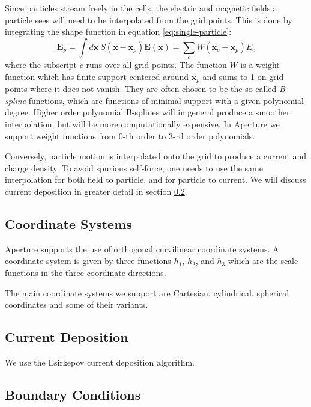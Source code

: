 Since particles stream freely in the cells, the electric and magnetic
fields a particle sees will need to be interpolated from the grid
points. This is done by integrating the shape function in equation
\eqref{eq:single-particle}:
\begin{equation}
    \label{eq:field-interpolate}
    \mathbf{E}_p = \int d\mathbf{x}\: S(\mathbf{x} - \mathbf{x}_p)\mathbf{E}(\mathbf{x}) = \sum_c W(\mathbf{x}_c - \mathbf{x}_p)E_c
\end{equation}
where the subscript $c$ runs over all grid points. The function $W$ is
a weight function which has finite support centered around
$\mathbf{x}_p$ and sums to 1 on grid points where it does not
vanish. They are often chosen to be the so called \textit{B-spline}
functions, which are functions of minimal support with a given
polynomial degree. Higher order polynomial B-splines will in general
produce a smoother interpolation, but will be more computationally
expensive. In Aperture we support weight functions from 0-th order to
3-rd order polynomials.

Conversely, particle motion is interpolated onto the grid to produce a
current and charge density. To avoid spurious self-force, one needs to
use the same interpolation for both field to particle, and for
particle to current. We will discuss current deposition in greater
detail in section \ref{sec:charge-cons-curr}.

\subsection{Coordinate Systems}
\label{sec:coord-syst-sing}

Aperture supports the use of orthogonal curvilinear coordinate
systems. A coordinate system is given by three functions $h_1$, $h_2$,
and $h_3$ which are the scale functions in the three coordinate
directions.

The main coordinate systems we support are Cartesian, cylindrical,
spherical coordinates and some of their variants.

\subsection{Current Deposition}
\label{sec:charge-cons-curr}

We use the Esirkepov current deposition algorithm.

\subsection{Boundary Conditions}
\label{sec:boundary-conditions}

